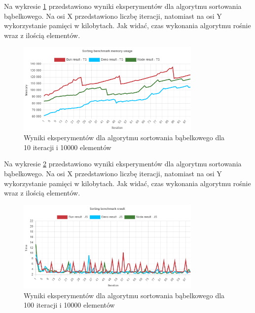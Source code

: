 Na wykresie \ref{fig:quick_sorting_e4_memory_ts} przedstawiono wyniki eksperymentów dla algorytmu sortowania bąbelkowego. Na osi X przedstawiono liczbę iteracji, natomiast na osi Y wykorzystanie pamięci w kilobytach. Jak widać, czas wykonania algorytmu rośnie wraz z ilością elementów.
\begin{figure}[H]
  \centering
  \includegraphics[width=0.8\textwidth]{Figures/sorting/quick/e4_memory_ts.png}
  \caption{Wyniki eksperymentów dla algorytmu sortowania bąbelkowego dla 10 iteracji i 10000 elementów}
  \label{fig:quick_sorting_e4_memory_ts}
\end{figure}

Na wykresie \ref{fig:quick_sorting_e5} przedstawiono wyniki eksperymentów dla algorytmu sortowania bąbelkowego. Na osi X przedstawiono liczbę iteracji, natomiast na osi Y wykorzystanie pamięci w kilobytach. Jak widać, czas wykonania algorytmu rośnie wraz z ilością elementów.
\begin{figure}[H]
  \centering
  \includegraphics[width=0.8\textwidth]{Figures/sorting/quick/e5_js.png}
  \caption{Wyniki eksperymentów dla algorytmu sortowania bąbelkowego dla 100 iteracji i 10000 elementów}
  \label{fig:quick_sorting_e5}
\end{figure}

